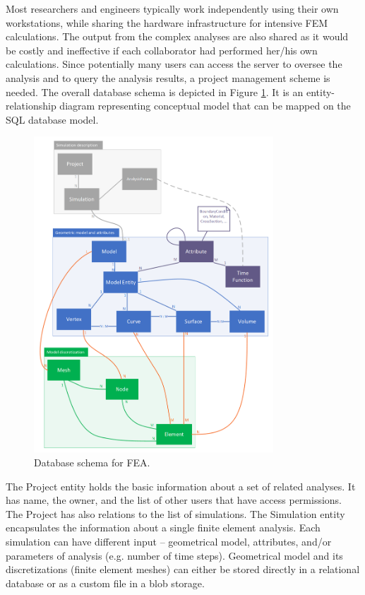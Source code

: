 Most researchers and engineers typically work independently using their own workstations, while sharing the hardware infrastructure for intensive FEM calculations. The output from the complex analyses are also shared as it would be costly and ineffective if each collaborator had performed her/his own calculations. Since potentially many users can access the server to oversee the analysis and to query the analysis results, a project management scheme is needed. The overall database schema is depicted in Figure \ref{fig:FEA-db-schema}. It is an entity-relationship diagram representing conceptual model that can be mapped on the SQL database model.

\begin{figure}[H]
    \centering
    \includegraphics[width=0.8\textwidth]{figures/FEA-database-schema}
    \decoRule
    \caption{Database schema for FEA.}
    \label{fig:FEA-db-schema}
\end{figure}


The Project entity holds the basic information about a set of related analyses. It has name, the owner, and the list of other users that have access permissions. The Project has also relations to the list of simulations. The Simulation entity encapsulates the information about a single finite element analysis. Each simulation can have different input -- geometrical model, attributes, and/or parameters of analysis (e.g. number of time steps). Geometrical model and its discretizations (finite element meshes) can either be stored directly in a relational database or as a custom file in a blob storage.

